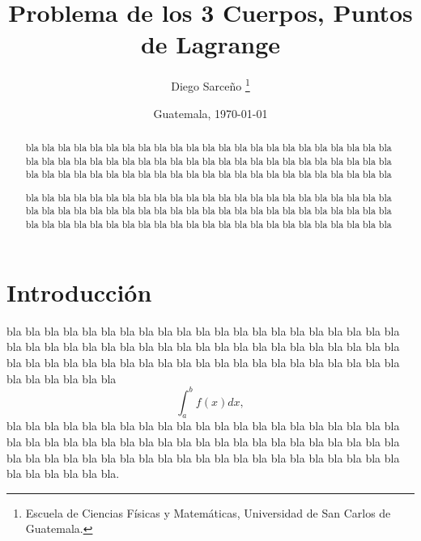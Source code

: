 







\title{\sc Problema de los 3 Cuerpos, Puntos de Lagrange}%
\author{Diego Sarceño \thanks{Escuela de Ciencias Físicas y Matemáticas,
  Universidad de San Carlos de Guatemala.}}
\date{Guatemala, \today}


\maketitle

\begin{abstract}
  bla bla bla bla bla bla bla bla bla bla bla bla bla bla bla bla bla bla bla
  bla bla bla bla bla bla bla bla bla bla bla bla bla bla bla bla bla bla bla
  bla bla bla bla bla bla bla bla bla bla bla bla bla bla bla bla bla bla bla
  bla bla bla bla bla bla bla bla bla bla bla bla

  bla bla bla bla bla bla bla bla bla bla bla bla bla bla bla bla bla bla bla
  bla bla bla bla bla bla bla bla bla bla bla bla bla bla bla bla bla bla bla
  bla bla bla bla bla bla bla bla bla bla bla bla bla bla bla bla bla bla bla
  bla bla bla bla bla bla bla bla bla bla bla bla 
\end{abstract}


\section{Introducción}
\label{sec:intro}
bla bla bla bla bla bla bla bla bla bla bla bla bla bla bla bla bla bla bla
bla bla bla bla bla bla bla bla bla bla bla bla bla bla bla bla bla bla bla
bla bla bla bla bla bla bla bla bla bla bla bla bla bla bla bla bla bla bla
bla bla bla bla bla bla bla bla bla bla bla bla
% 
\begin{displaymath}
  \int_a^b f(x) dx,
\end{displaymath}
%
bla bla bla bla bla bla bla bla bla bla bla bla bla bla bla bla bla bla bla
bla bla bla bla bla bla bla bla bla bla bla bla bla bla bla bla bla bla bla
bla bla bla bla bla bla bla bla bla bla bla bla bla bla bla bla bla bla bla
bla bla bla bla bla bla bla bla bla bla bla bla.



